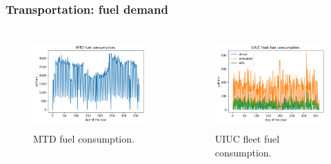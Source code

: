 \begin{frame}
\frametitle{Transportation: fuel demand}
\begin{columns}
    \column[t]{5cm}
	\begin{figure}[htbp!]
		\begin{center}
			\includegraphics[height=3.5cm]{images/mtd2}
		\end{center}
		\caption{MTD fuel consumption.}
	\end{figure}

	\column[t]{5cm}
	\begin{figure}[htbp!]
		\begin{center}
			\includegraphics[height=3.5cm]{images/uiuc}
		\end{center}
		\caption{UIUC fleet fuel consumption.}
	\end{figure}
\end{columns}
\end{frame}



